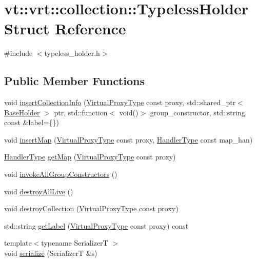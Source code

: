 \hypertarget{structvt_1_1vrt_1_1collection_1_1_typeless_holder}{}\section{vt\+:\+:vrt\+:\+:collection\+:\+:Typeless\+Holder Struct Reference}
\label{structvt_1_1vrt_1_1collection_1_1_typeless_holder}


{\ttfamily \#include $<$typeless\+\_\+holder.\+h$>$}

\subsection*{Public Member Functions}
\begin{DoxyCompactItemize}
\item 
void \hyperlink{structvt_1_1vrt_1_1collection_1_1_typeless_holder_aba0109213f140b0d75aea64fb2f1f7a0}{insert\+Collection\+Info} (\hyperlink{namespacevt_a1b417dd5d684f045bb58a0ede70045ac}{Virtual\+Proxy\+Type} const proxy, std\+::shared\+\_\+ptr$<$ \hyperlink{structvt_1_1vrt_1_1collection_1_1_base_holder}{Base\+Holder} $>$ ptr, std\+::function$<$ void()$>$ group\+\_\+constructor, std\+::string const \&label=\{\})
\item 
void \hyperlink{structvt_1_1vrt_1_1collection_1_1_typeless_holder_a10484ae97f0d9cf0011e746806a89481}{insert\+Map} (\hyperlink{namespacevt_a1b417dd5d684f045bb58a0ede70045ac}{Virtual\+Proxy\+Type} const proxy, \hyperlink{namespacevt_af64846b57dfcaf104da3ef6967917573}{Handler\+Type} const map\+\_\+han)
\item 
\hyperlink{namespacevt_af64846b57dfcaf104da3ef6967917573}{Handler\+Type} \hyperlink{structvt_1_1vrt_1_1collection_1_1_typeless_holder_a0f3c1ebd1441f70b896aedfa7a9cf0a0}{get\+Map} (\hyperlink{namespacevt_a1b417dd5d684f045bb58a0ede70045ac}{Virtual\+Proxy\+Type} const proxy)
\item 
void \hyperlink{structvt_1_1vrt_1_1collection_1_1_typeless_holder_aa2c47fe8c1047b336e4ff000a7523bfa}{invoke\+All\+Group\+Constructors} ()
\item 
void \hyperlink{structvt_1_1vrt_1_1collection_1_1_typeless_holder_af968b98622d1d81888d8667a94e5950d}{destroy\+All\+Live} ()
\item 
void \hyperlink{structvt_1_1vrt_1_1collection_1_1_typeless_holder_a79330546a2110fe7d7b6bdd2929db2de}{destroy\+Collection} (\hyperlink{namespacevt_a1b417dd5d684f045bb58a0ede70045ac}{Virtual\+Proxy\+Type} const proxy)
\item 
std\+::string \hyperlink{structvt_1_1vrt_1_1collection_1_1_typeless_holder_a01c16f3ec44ea396b9f07dc0cedf3aad}{get\+Label} (\hyperlink{namespacevt_a1b417dd5d684f045bb58a0ede70045ac}{Virtual\+Proxy\+Type} const proxy) const
\item 
{\footnotesize template$<$typename SerializerT $>$ }\\void \hyperlink{structvt_1_1vrt_1_1collection_1_1_typeless_holder_a812cc4810b97976daed2317dc1c227f9}{serialize} (SerializerT \&s)
\end{DoxyCompactItemize}
